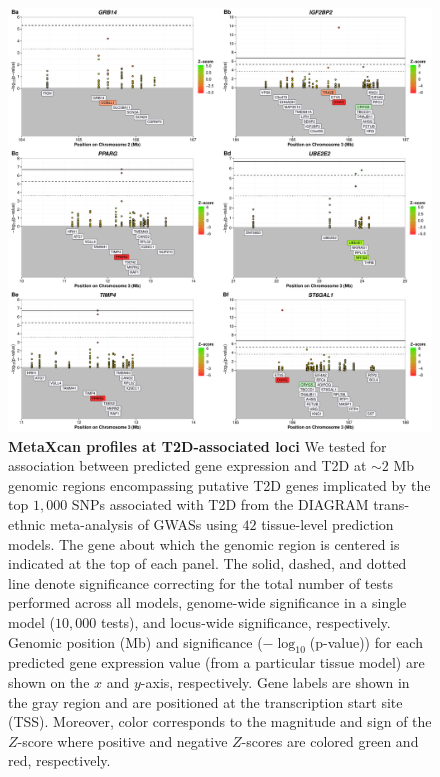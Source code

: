 \documentclass[10pt]{article}
\begin{document}
\begin{figure}
\ContinuedFloat
\includegraphics[width=\textwidth]{sup_fig1_part2_locusArray.pdf}
	\caption{\textbf{MetaXcan profiles at T2D-associated loci} We tested for association between predicted gene expression and T2D at $\sim2$ Mb genomic regions encompassing putative T2D genes implicated by the top $1,000$ SNPs associated with T2D from the DIAGRAM trans-ethnic meta-analysis of GWASs using $42$ tissue-level prediction models. The gene about which the genomic region is centered is indicated at the top of each panel. The solid, dashed, and dotted line denote significance correcting for the total number of tests performed across all models, genome-wide significance in a single model ($10,000$ tests), and locus-wide significance, respectively. Genomic position (Mb) and significance ($-\log_{10}$(p-value)) for each predicted gene expression value (from a particular tissue model) are shown on the $x$ and $y$-axis, respectively. Gene labels are shown in the gray region and are positioned at the transcription start site (TSS). Moreover, color corresponds to the magnitude and sign of the $Z$-score where positive and negative $Z$-scores are colored green and red, respectively.} 
    \label{fig:supp.locus_array_fig1_part2}
\end{figure}
\end{document}
